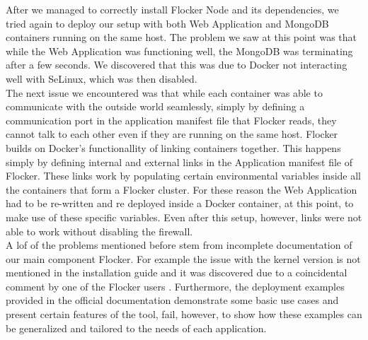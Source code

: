 \documentclass{article}
\begin{document}
After we managed to correctly install Flocker Node and its dependencies, we tried again to deploy our setup with both Web Application and MongoDB containers running on the same host. The problem we saw at this point was that while the Web Application was functioning well, the MongoDB was terminating after a few seconds. We discovered that this was due to Docker not interacting well with SeLinux, which was then disabled.\\
The next issue we encountered was that while each container was able to communicate with the outside world seamlessly, simply by defining a communication port in the application manifest file that Flocker reads, they cannot talk to each other even if they are running on the same host. Flocker builds on Docker's functionallity of linking containers together. This happens simply by defining internal and external links in the Application manifest file of Flocker. These links work by populating certain environmental variables inside all the containers that form a Flocker cluster. For these reason the Web Application had to be re-written and re deployed inside a Docker container, at this point, to make use of these specific variables. Even after this setup, however, links were not able to work without disabling the firewall.\\
A lof of the problems mentioned before stem from incomplete documentation of our main component Flocker. For example the issue with the kernel version is not mentioned in the installation guide and it was discovered due to a coincidental comment by one of the Flocker users \cite{flocker-install}. Furthermore, the deployment examples provided in the official documentation demonstrate some basic use cases and present certain features of the tool, fail, however, to show how these examples can be generalized and tailored to the needs of each application.
\end{document}
